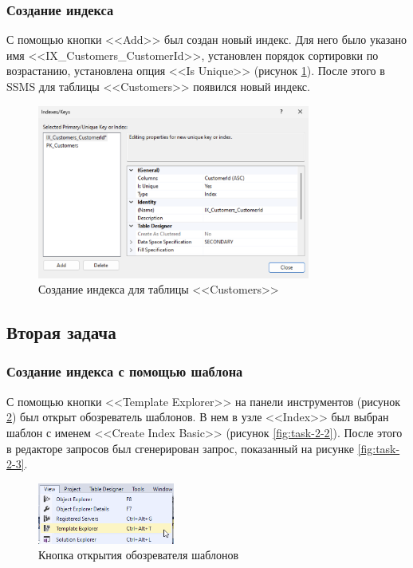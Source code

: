 \documentclass[a4paper, 14pt]{extarticle}
\begin{document}
\subsubsection{Создание индекса}

С помощью кнопки <<Add>> был создан новый индекс. Для него было указано имя
<<\foreignlanguage{english}{IX\_Customers\_CustomerId}>>, установлен порядок
сортировки по возрастанию, установлена опция <<\foreignlanguage{english}{Is
Unique}>> (рисунок \ref{fig:task-1-4}). После этого в SSMS для таблицы
<<\foreignlanguage{english}{Customers}>> появился новый индекс.

\begin{figure}[H]
  \centering
  \includegraphics[width=0.8\textwidth]{images/task-1/4.png}
  \caption{Создание индекса для таблицы <<Customers>>}
  \label{fig:task-1-4}
\end{figure}

\subsection{Вторая задача}

\subsubsection{Создание индекса с помощью шаблона}

С помощью кнопки <<\foreignlanguage{english}{Template Explorer}>> на панели
инструментов (рисунок \ref{fig:task-2-1}) был открыт обозреватель шаблонов. В
нем в узле <<\foreignlanguage{english}{Index}>> был выбран шаблон с именем
<<\foreignlanguage{english}{Create Index Basic}>> (рисунок \ref{fig:task-2-2}).
После этого в редакторе запросов был сгенерирован запрос, показанный на рисунке
\ref{fig:task-2-3}.

\begin{figure}[H]
  \centering
  \includegraphics[width=0.4\textwidth]{images/task-2/1.png}
  \caption{Кнопка открытия обозревателя шаблонов}
  \label{fig:task-2-1}
\end{figure}
\end{document}
